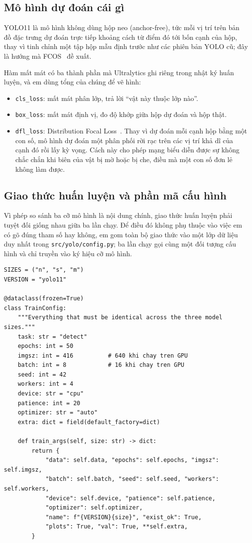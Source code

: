 \documentclass[11pt,a4paper]{article}
\begin{document}
\subsection{Mô hình dự đoán cái gì}

YOLO11 là mô hình không dùng hộp neo (anchor-free), tức mỗi vị trí trên bản đồ đặc trưng dự đoán
trực tiếp khoảng cách từ điểm đó tới bốn cạnh của hộp, thay vì tinh chỉnh một tập hộp mẫu định
trước như các phiên bản YOLO cũ; đây là hướng mà FCOS~\cite{tian2019} đề xuất.

Hàm mất mát có ba thành phần mà Ultralytics ghi riêng trong nhật ký huấn luyện, và em dùng tổng của
chúng để vẽ hình:

\begin{itemize}
  \item \texttt{cls\_loss}: mất mát phân lớp, trả lời ``vật này thuộc lớp nào''.
  \item \texttt{box\_loss}: mất mát định vị, đo độ khớp giữa hộp dự đoán và hộp thật.
  \item \texttt{dfl\_loss}: Distribution Focal Loss~\cite{li2020}. Thay vì dự đoán mỗi cạnh hộp
        bằng một con số, mô hình dự đoán một phân phối rời rạc trên các vị trí khả dĩ của cạnh đó
        rồi lấy kỳ vọng. Cách này cho phép mạng biểu diễn được sự không chắc chắn khi biên của vật
        bị mờ hoặc bị che, điều mà một con số đơn lẻ không làm được.
\end{itemize}

\subsection{Giao thức huấn luyện và phần mã cấu hình}

Vì phép so sánh ba cỡ mô hình là nội dung chính, giao thức huấn luyện phải tuyệt đối giống nhau
giữa ba lần chạy. Để điều đó không phụ thuộc vào việc em có gõ đúng tham số hay không, em gom toàn
bộ giao thức vào một lớp dữ liệu duy nhất trong \texttt{src/yolo/config.py}; ba lần chạy gọi cùng
một đối tượng cấu hình và chỉ truyền vào ký hiệu cỡ mô hình.

\begin{lstlisting}
SIZES = ("n", "s", "m")
VERSION = "yolo11"

@dataclass(frozen=True)
class TrainConfig:
    """Everything that must be identical across the three model sizes."""
    task: str = "detect"
    epochs: int = 50
    imgsz: int = 416          # 640 khi chay tren GPU
    batch: int = 8            # 16 khi chay tren GPU
    seed: int = 42
    workers: int = 4
    device: str = "cpu"
    patience: int = 20
    optimizer: str = "auto"
    extra: dict = field(default_factory=dict)

    def train_args(self, size: str) -> dict:
        return {
            "data": self.data, "epochs": self.epochs, "imgsz": self.imgsz,
            "batch": self.batch, "seed": self.seed, "workers": self.workers,
            "device": self.device, "patience": self.patience,
            "optimizer": self.optimizer,
            "name": f"{VERSION}{size}", "exist_ok": True,
            "plots": True, "val": True, **self.extra,
        }
\end{lstlisting}
\end{document}
